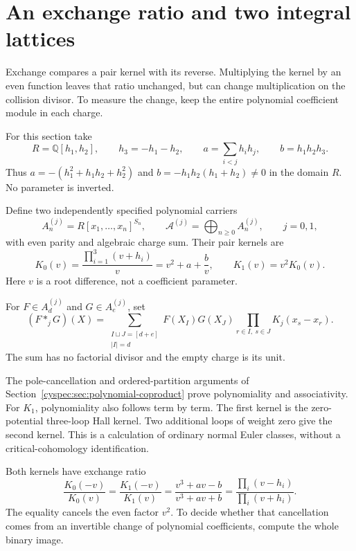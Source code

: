\section{An exchange ratio and two integral lattices}
\label{cyspec:sec:lattices}

Exchange compares a pair kernel with its reverse. Multiplying the
kernel by an even function leaves that ratio unchanged, but can
change multiplication on the collision divisor. To measure the
change, keep the entire polynomial coefficient module in each charge.

For this section take
\begin{equation}\label{cyspec:eq:parameter-ring}
 R=\mathbb Q[h_1,h_2],\qquad h_3=-h_1-h_2,\qquad
 a=\sum_{i<j}h_i h_j,\qquad b=h_1h_2h_3.
\end{equation}
Thus $a=-(h_1^2+h_1h_2+h_2^2)$ and $b=-h_1h_2(h_1+h_2)\ne0$
in the domain $R$. No parameter is inverted.

Define two independently specified polynomial carriers
\[
 A_n^{(j)}=R[x_1,\ldots,x_n]^{S_n},\qquad
 \mathcal A^{(j)}=\bigoplus_{n\geq0}A_n^{(j)},\qquad j=0,1,
\]
with even parity and algebraic charge sum. Their pair kernels are
\begin{equation}\label{cyspec:eq:two-kernels}
 K_0(v)=\frac{\prod_{i=1}^3(v+h_i)}{v}
       =v^2+a+\frac bv,\qquad
 K_1(v)=v^2K_0(v).
\end{equation}
Here $v$ is a root difference, not a coefficient parameter.

For $F\in A_d^{(j)}$ and $G\in A_e^{(j)}$, set
\begin{equation}\label{cyspec:eq:two-products}
 (F*_jG)(X)=\sum_{\substack{I\sqcup J=[d+e]\\|I|=d}}
 F(X_I)G(X_J)\prod_{r\in I,\ s\in J}K_j(x_s-x_r).
\end{equation}
The sum has no factorial divisor and the empty charge is its unit.

The pole-cancellation and ordered-partition arguments of
Section~\ref{cyspec:sec:polynomial-coproduct} prove polynomiality and
associativity. For $K_1$, polynomiality also follows term by term.
The first kernel is the zero-potential three-loop Hall kernel.
Two additional loops of weight zero give the second kernel.
This is a calculation of ordinary normal Euler classes, without
a critical-cohomology identification.

Both kernels have exchange ratio
\begin{equation}\label{cyspec:eq:common-ratio}
 \frac{K_0(-v)}{K_0(v)}=\frac{K_1(-v)}{K_1(v)}
 =\frac{v^3+av-b}{v^3+av+b}
 =\frac{\prod_i(v-h_i)}{\prod_i(v+h_i)}.
\end{equation}
The equality cancels the even factor $v^2$.
To decide whether that cancellation comes from an invertible
change of polynomial coefficients, compute the whole binary image.

